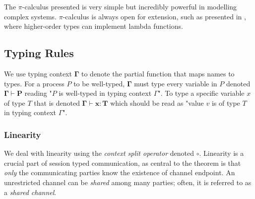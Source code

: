 The $\pi$-calculus presented is very simple but incredibly powerful in modelling complex systems. $\pi$-calculus is always open for extension, such as presented in \citep{sangiorgi2003pi}, where higher-order types can implement lambda functions. 

\subsection{Typing Rules}

We use typing context $\boldsymbol{\Gamma}$ to denote the partial function that maps names to types. For a process $P$ to be well-typed, $\boldsymbol{\Gamma}$ must type every variable in $P$ denoted $\boldsymbol{\Gamma \vdash P}$ reading "$P$ is well-typed in typing context $\Gamma$". To type a specific variable $x$ of type $T$ that is denoted $\boldsymbol{\Gamma \vdash x : T}$ which should be read as "value $v$ is of type $T$ in typing context $\Gamma$". 

\subsubsection{Linearity} We deal with linearity using the \textit{context split operator} \cite{vasconcelos2012fundamentals} denoted $\circ$. Linearity is a crucial part of session typed communication, as central to the theorem is that \textit{only} the communicating parties know the existence of channel endpoint. An unrestricted channel can be \textit{shared} among many parties; often, it is referred to as a \textit{shared channel}.


